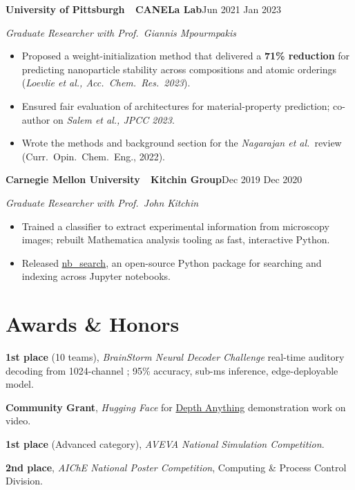 \documentclass[10pt,letterpaper]{article}
\newcommand{\sansfam}{\sffamily}
\newcommand{\monofam}{\ttfamily}
\newcommand{\bdash}{\,\textemdash\,}
\newcommand{\datestamp}[1]{{\sansfam\footnotesize\color{meta}\figureversion{lf}#1}}
\newcommand{\role}[2]{%
  \filbreak%
  \par\vspace{1pt}%
  \noindent\textbf{#1}\hfill\datestamp{#2}\par\nopagebreak}
\newcommand{\sub}[1]{\noindent\textit{\footnotesize\color{meta} #1}\par\nopagebreak}
\newcommand{\acro}[1]{\textls[80]{#1}}
\begin{document}
\role{University of Pittsburgh \bdash{} CANELa Lab}{Jun 2021 \textendash{} Jan 2023}
\sub{Graduate Researcher with Prof.\ Giannis Mpourmpakis}
\begin{itemize}
  \item Proposed a weight-initialization method that delivered a \textbf{71\% \acro{RMSE} reduction} for predicting nanoparticle stability across compositions and atomic orderings (\emph{Loevlie et al., Acc.\ Chem.\ Res.\ 2023}).
  \item Ensured fair evaluation of \acro{ML} architectures for material-property prediction; co-author on \emph{Salem et al., JPCC 2023}.
  \item Wrote the \acro{ML} methods and background section for the \emph{Nagarajan et al.}\ review (Curr.\ Opin.\ Chem.\ Eng., 2022).
\end{itemize}

\role{Carnegie Mellon University \bdash{} Kitchin Group}{Dec 2019 \textendash{} Dec 2020}
\sub{Graduate Researcher with Prof.\ John Kitchin}
\begin{itemize}
  \item Trained a \acro{CNN} classifier to extract experimental information from microscopy images; rebuilt Mathematica analysis tooling as fast, interactive Python.
  \item Released \href{https://tinyurl.com/yzpperdc}{\monofam nb\_search}, an open-source Python package for searching and indexing across Jupyter notebooks.
\end{itemize}

\section{Awards \& Honors}

\begin{list}{}{%
  \setlength{\leftmargin}{3.4em}%
  \setlength{\labelwidth}{2.6em}%
  \setlength{\labelsep}{0.5em}%
  \setlength{\itemsep}{1pt}%
  \setlength{\parsep}{0pt}%
  \setlength{\topsep}{1pt}}
\item[\datestamp{2026}] \textbf{1st place} (10 teams), \textit{BrainStorm Neural Decoder Challenge}\bdash{}real-time auditory decoding from 1024-channel \acro{ECoG}; 95\% accuracy, sub-ms inference, edge-deployable model.
\item[\datestamp{2024}] \textbf{Community Grant}, \textit{Hugging Face}\bdash{}for \href{https://depth-anything.github.io/}{Depth Anything} demonstration work on video.
\item[\datestamp{2019}] \textbf{1st place} (Advanced category), \textit{AVEVA National Simulation Competition}.
\item[\datestamp{2018}] \textbf{2nd place}, \textit{AIChE National Poster Competition}, Computing \& Process Control Division.
\end{list}
\end{document}
